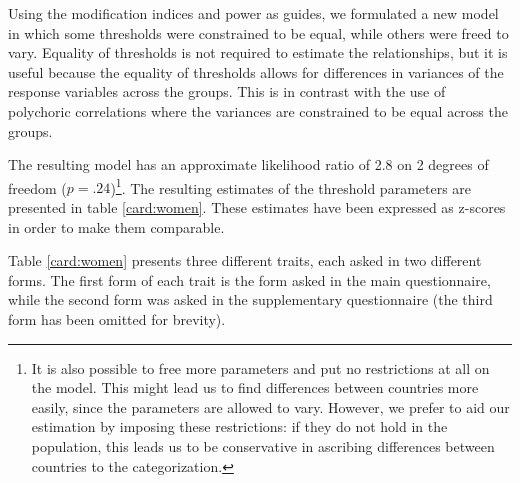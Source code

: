 \documentclass[a4paper,12pt]{article}
\begin{document}
Using the modification indices and power as guides, we formulated a new model in which some thresholds were constrained to be equal, while others were freed to vary. Equality of thresholds is not required to estimate the relationships, but it is useful because the equality of thresholds allows for differences in variances of the response variables across the groups. This is in contrast with the use of polychoric correlations where the variances are constrained to be equal across the groups.

 The resulting model has an approximate likelihood ratio of 2.8 on 2 degrees of freedom ($p=.24$)\footnote{It is also possible to free more parameters and put no restrictions at all on the model. This might lead us to find differences between countries more easily, since the parameters are allowed to vary. However, we prefer to aid our estimation by imposing these restrictions: if they do not hold in the population, this leads us to be conservative in ascribing differences between countries to the categorization.}. The resulting estimates of the threshold parameters are presented in table \ref{card:women}. These estimates have been expressed as z-scores in order to make them comparable.

Table \ref{card:women} presents three different traits, each asked in two different forms. The first form of each trait is the form asked in the main questionnaire, while the second form was asked in the supplementary questionnaire (the third form has been omitted for brevity). 
\end{document}
